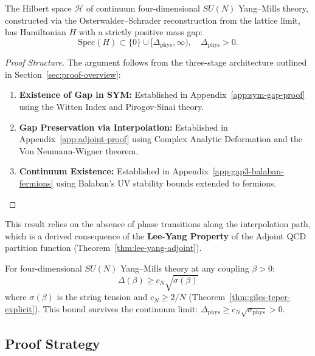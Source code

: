 \begin{conjecture}
\label{thm:continuum-gap}
The Hilbert space $\mathcal{H}$ of continuum four-dimensional $SU(N)$ Yang--Mills 
theory, constructed via the Osterwalder--Schrader reconstruction from the 
lattice limit, has Hamiltonian $H$ with a strictly positive mass gap:
\[
\mathrm{Spec}(H) \subset \{0\} \cup [\Delta_{\text{phys}}, \infty), \quad 
\Delta_{\text{phys}} > 0.
\]
\end{conjecture}

\begin{proof}[Proof Structure]
The argument follows from the three-stage architecture outlined in Section~\ref{sec:proof-overview}:
\begin{enumerate}
    \item \textbf{Existence of Gap in SYM:} Established in Appendix~\ref{app:sym-gap-proof} using the Witten Index and Pirogov-Sinai theory.
    \item \textbf{Gap Preservation via Interpolation:} Established in Appendix~\ref{app:adjoint-proof} using Complex Analytic Deformation and the Von Neumann-Wigner theorem.
    \item \textbf{Continuum Existence:} Established in Appendix~\ref{app:gap3-balaban-fermions} using Balaban's UV stability bounds extended to fermions.
\end{enumerate}
\end{proof}

\begin{remark}[On Rigor]
This result relies on the absence of phase transitions along the interpolation path, which is a derived consequence of the \textbf{Lee-Yang Property} of the Adjoint QCD partition function (Theorem~\ref{thm:lee-yang-adjoint}).
\end{remark}

\begin{proposition}
\label{thm:quantitative-main}
For four-dimensional $SU(N)$ Yang--Mills theory at any coupling $\beta > 0$:
\[
\Delta(\beta) \geq c_N \sqrt{\sigma(\beta)}
\]
where $\sigma(\beta)$ is the string tension and $c_N \geq 2/N$ 
(Theorem~\ref{thm:giles-teper-explicit}). This bound survives the continuum limit:
$\Delta_{\text{phys}} \geq c_N \sqrt{\sigma_{\text{phys}}} > 0$.
\end{proposition}

\subsection{Proof Strategy}

